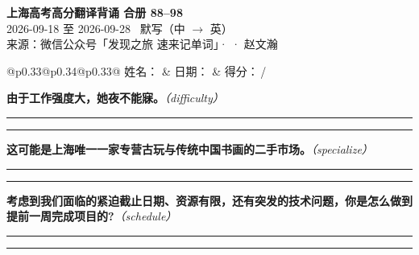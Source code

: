 \documentclass[11pt,a4paper]{article}
\newcommand{\num}[1]{\makebox[1.9em][r]{#1.}\hspace{0.3em}}
\newcommand{\wline}{\noindent\rule{\linewidth}{0.4pt}}
\newcommand{\prompt}[1]{\emph{\textcolor{tipblue}{\small（#1）}}}
\begin{document}
\pagestyle{plain}
\begin{center}
{\LARGE\bfseries 上海高考高分翻译背诵 \quad 合册 88–98}\\[0.25em]
{\large 2026-09-18 至 2026-09-28 \quad\ 默写（中 $\to$ 英）}\\[0.35em]
{\footnotesize 来源：微信公众号「发现之旅 速来记单词」·  · 赵文瀚}
\end{center}

\vspace{0.4em}
\noindent\begin{tabular}{@{}p{0.33\textwidth}@{}p{0.34\textwidth}@{}p{0.33\textwidth}@{}}
姓名：\underline{\hspace{2.0cm}} & 日期：\underline{\hspace{2.0cm}} & 得分：\underline{\hspace{1.4cm}}\,/ \\
\end{tabular}

\vspace{0.5em}

\vspace{0.8em}
\vspace{0.35em}\vspace{0.15em}

\begin{minipage}{\linewidth}

\num{1}\textbf{由于工作强度大，她夜不能寐。}\prompt{difficulty}

\vspace{0.3em}

\wline\vspace{0.3em}
\wline

\end{minipage}

\begin{minipage}{\linewidth}

\num{2}\textbf{这可能是上海唯一一家专营古玩与传统中国书画的二手市场。}\prompt{specialize}

\vspace{0.3em}

\wline\vspace{0.3em}
\wline

\end{minipage}

\begin{minipage}{\linewidth}

\num{3}\textbf{考虑到我们面临的紧迫截止日期、资源有限，还有突发的技术问题，你是怎么做到提前一周完成项目的?}\prompt{schedule}

\vspace{0.3em}

\wline\vspace{0.3em}
\wline

\end{minipage}
\end{document}
